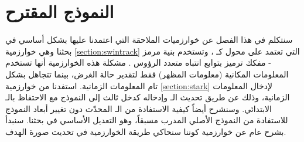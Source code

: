 \chapter{النموذج المقترح}

سنتكلم في هذا الفصل عن خوارزميات الملاحقة التي اعتمدنا عليها بشكل أساسي في بحثنا وهي خوارزمية 
\ref{section:swintrack}
التي تعتمد على محول 
كـ
،
وتستخدم بنية مرمز - مفكك ترميز
بتوابع انتباه متعدد الرؤوس 
.
مشكلة هذه الخوارزمية أنها تستخدم المعلومات المكانية (معلومات المظهر) فقط لتقدير حالة الغرض، بينما تتجاهل بشكل تام المعلومات الزمانية.
\newline
استفدنا من خوارزمية 
 \ref{section:stark}
لإدخال المعلومات الزمانية، وذلك عن طريق تحديث الـ
وإدخاله كدخل ثالث إلى النموذج مع الاحتفاظ بالـ 
الابتدائي.
وسنشرح أيضاً كيفية الاستفادة من الـ
المحدّث دون تغيير أبعاد النموذج للاستفادة من النموذج الأصلي المدرب مسبقاً، وهو التعديل الأساسي في بحثنا.
\newline
سنبدأ بشرح عام عن خوارزمية 
كوننا سنحاكي طريقة الخوارزمية في تحديث صورة الهدف.



